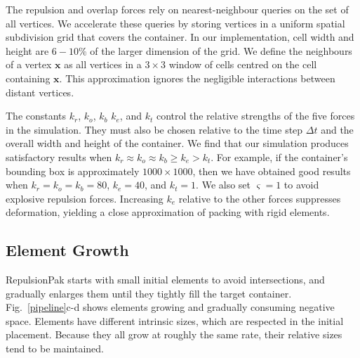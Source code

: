 
The repulsion and overlap forces rely on nearest-neighbour queries on the
set of all vertices.  We accelerate these queries by storing vertices in a
uniform spatial subdivision grid that covers the container.  In our
implementation, cell width and height are $6-10$\% of the larger dimension
of the grid.  
We define the neighbours of a vertex $\bm{x}$ as
all vertices in a $3\times 3$ window of cells centred on the cell
containing $\bm{x}$. 
This approximation ignores the negligible interactions between
distant vertices.

The constants $k_r$, $k_o$, $k_b$  $k_e$, and $k_t$ control the relative strengths
of the five forces in the simulation.  They must also be chosen relative to
the time step $\Delta t$ and the overall width and height of the container.
We find that our simulation produces satisfactory results when 
$k_r \approx k_o \approx k_b \geq k_e > k_t$.
For example, if the container's bounding box is approximately $1000\times 1000$,
then we have obtained good results when $k_r=k_o=k_b=80$, $k_e=40$, and $k_t=1$.  We also
set $\varsigma=1$ to avoid explosive repulsion forces.  Increasing $k_e$
relative to the other forces suppresses deformation, yielding a close approximation
of packing with rigid elements.


\subsection{Element Growth}
\label{repulsionpak_element_growth}

RepulsionPak starts with small initial elements to avoid intersections,
and gradually enlarges them until they tightly fill the target
container.  Fig.~\ref{pipeline}c-d shows elements growing and gradually
consuming negative space.  Elements have different intrinsic sizes, which are
respected in the initial placement.  Because they all grow at roughly the
same rate, their relative sizes tend to be maintained.

